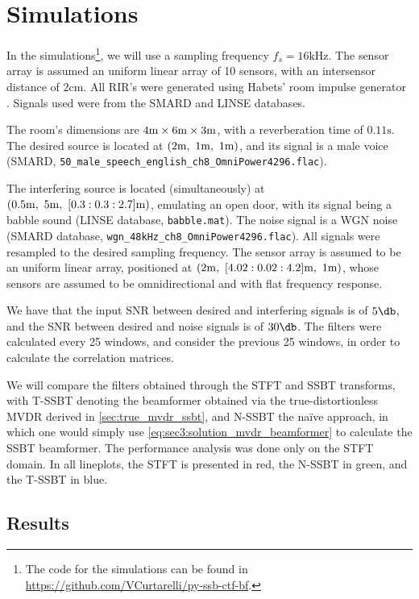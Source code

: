 
\section{Simulations}
\label{sec:results}

In the simulations\footnote{The code for the simulations can be found in \url{https://github.com/VCurtarelli/py-ssb-ctf-bf}.}, we will use a sampling frequency $f_s = 16\si{\kilo\hertz}$. The sensor array is assumed an uniform linear array of 10 sensors, with an intersensor distance of $2\si{\cm}$. All RIR's were generated using Habets' room impulse generator \cite{habets-rir-generator}. Signals used were from the SMARD \cite{smard-db} and LINSE \cite{linse-db} databases.

The room's dimensions are $4\si{\meter}\times6\si{\meter}\times3\si{\meter}$, with a reverberation time of $0.11\si{\second}$. The desired source is located at $(2\si{\meter},~1\si{\meter},~1\si{\meter})$, and its signal is a male voice (SMARD, \texttt{50\_male\_speech\_english\_ch8\_OmniPower4296.flac}).

The interfering source is located (simultaneously) at $(0.5\si{\meter},~5\si{\meter},~[0.3:0.3:2.7]\si{\meter})$, emulating an open door, with its signal being a babble sound (LINSE database, \texttt{babble.mat}). The noise signal is a WGN noise (SMARD database, \texttt{wgn\_48kHz\_ch8\_OmniPower4296.flac}). All signals were resampled to the desired sampling frequency. The sensor array is assumed to be an uniform linear array, positioned at $(2\si{\meter},~[4.02:0.02:4.2]\si{\meter},~1\si{\meter})$, whose sensors are assumed to be omnidirectional and with flat frequency response.

We have that the input SNR between desired and interfering signals is of $5\dB$, and the SNR between desired and noise signals is of $30\dB$. The filters were calculated every 25 windows, and consider the previous 25 windows, in order to calculate the correlation matrices.

We will compare the filters obtained through the STFT and SSBT transforms, with T-SSBT denoting the beamformer obtained via the true-distortionless MVDR derived in \cref{sec:true_mvdr_ssbt}, and N-SSBT the naïve approach, in which one would simply use \cref{eq:sec3:solution_mvdr_beamformer} to calculate the SSBT beamformer. The performance analysis was done only on the STFT domain. In all lineplots, the STFT is presented in red, the N-SSBT in green, and the T-SSBT in blue.

\subsection{Results}

